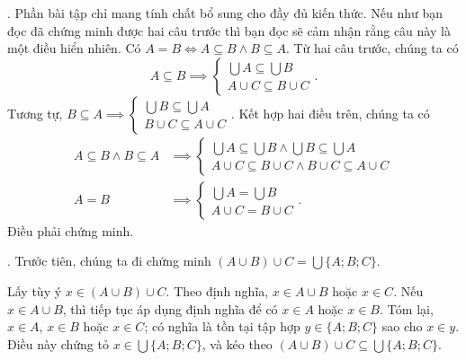 . Phần bài tập chỉ mang tính chất bổ sung cho đầy đủ kiến thức. Nếu như bạn đọc đã chứng minh được hai câu trước thì bạn đọc sẽ cảm nhận rằng câu này là một điều hiển nhiên. Có $A = B \iff A \subseteq B \land B \subseteq A$. Từ hai câu trước, chúng ta có
\begin{equation*}
   A \subseteq B \implies \begin{cases}
      \bigcup A \subseteq \bigcup B \\
      A \cup C \subseteq B \cup C
   \end{cases}.
\end{equation*}
Tương tự, $B \subseteq A \implies \begin{cases}
      \bigcup B \subseteq \bigcup A \\
      B \cup C \subseteq A \cup C
   \end{cases}$.
Kết hợp hai điều trên, chúng ta có
\begin{align*}
   A \subseteq B \land B \subseteq A & \implies \begin{cases}
                                                   \bigcup A \subseteq \bigcup B \land \bigcup B \subseteq \bigcup A \\
                                                   A \cup C \subseteq B \cup C \land B \cup C \subseteq A \cup C
                                                \end{cases} \\
   A = B                             & \implies \begin{cases}
                                                   \bigcup A = \bigcup B \\
                                                   A \cup C = B \cup C
                                                \end{cases}.
\end{align*}
Điều phải chứng minh.

. Trước tiên, chúng ta đi chứng minh $(A \cup B) \cup C = \bigcup \{A; B; C\}$.

Lấy tùy ý $x \in (A \cup B) \cup C$. Theo định nghĩa, $x \in A \cup B$ hoặc $x \in C$. Nếu $x \in A \cup B$, thì tiếp tục áp dụng định nghĩa để có $x \in A$ hoặc $x \in B$. Tóm lại, $x \in A$, $x \in B$ hoặc $x \in C$; có nghĩa là tồn tại tập hợp $y \in \{A; B; C\}$ sao cho $x \in y$. Điều này chứng tỏ $x \in \bigcup \{A; B; C\}$, và kéo theo $(A \cup B) \cup C \subseteq \bigcup \{A; B; C\}$.

